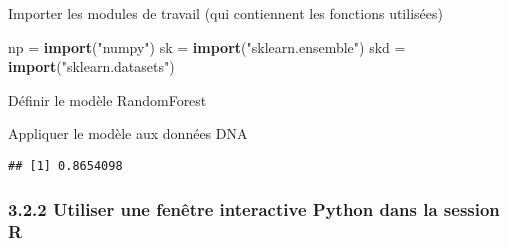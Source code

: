 \documentclass[]{article}
\newenvironment{Shaded}{\begin{snugshade}}{\end{snugshade}}
\newcommand{\DataTypeTok}[1]{\textcolor[rgb]{0.13,0.29,0.53}{#1}}
\newcommand{\KeywordTok}[1]{\textcolor[rgb]{0.13,0.29,0.53}{\textbf{#1}}}
\newcommand{\NormalTok}[1]{#1}
\newcommand{\OperatorTok}[1]{\textcolor[rgb]{0.81,0.36,0.00}{\textbf{#1}}}
\newcommand{\StringTok}[1]{\textcolor[rgb]{0.31,0.60,0.02}{#1}}
\begin{document}
Importer les modules de travail (qui contiennent les fonctions
utilisées)

\begin{Shaded}
\begin{Highlighting}[]
\NormalTok{np  =}\StringTok{ }\KeywordTok{import}\NormalTok{(}\StringTok{"numpy"}\NormalTok{)}
\NormalTok{sk  =}\StringTok{ }\KeywordTok{import}\NormalTok{(}\StringTok{"sklearn.ensemble"}\NormalTok{)}
\NormalTok{skd =}\StringTok{ }\KeywordTok{import}\NormalTok{(}\StringTok{"sklearn.datasets"}\NormalTok{)}
\end{Highlighting}
\end{Shaded}

Définir le modèle RandomForest

\begin{Shaded}
\end{Shaded}

Appliquer le modèle aux données DNA

\begin{Shaded}
\end{Shaded}

\begin{verbatim}
## [1] 0.8654098
\end{verbatim}

\hypertarget{utiliser-une-fenetre-interactive-python-dans-la-session-r}{%
\subsubsection{3.2.2 Utiliser une fenêtre interactive Python dans la
session
R}\label{utiliser-une-fenetre-interactive-python-dans-la-session-r}}
\end{document}
